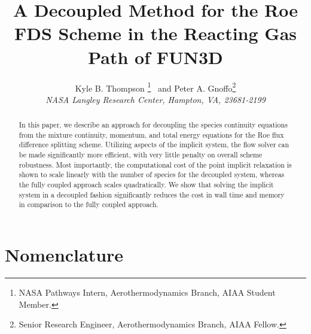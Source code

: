 \documentclass[]{aiaa-tc}%
\title{A Decoupled Method for the Roe FDS Scheme in the Reacting Gas Path of FUN3D}
\author{
  Kyle B. Thompson%
    \thanks{NASA Pathways Intern, Aerothermodynamics Branch, AIAA Student Member.}
  \ and Peter A. Gnoffo\thanks{Senior Research Engineer, Aerothermodynamics Branch, AIAA Fellow.}\\
  {\normalsize\itshape
   NASA Langley Research Center, Hampton, VA, 23681-2199}\\
 }
\begin{document}
\maketitle

\begin{abstract}
In this paper, we describe an approach for decoupling the species continuity equations from the mixture continuity, momentum, and total energy equations for the Roe flux difference splitting scheme.  Utilizing aspects of the implicit system, the flow solver can be made significantly more efficient, with very little penalty on overall scheme robustness.  Most importantly, the computational cost of the point implicit relaxation is shown to scale linearly with the number of species for the decoupled system, whereas the fully coupled approach scales quadratically.  We show that solving the implicit system in a decoupled fashion significantly reduces the cost in wall time and memory in comparison to the fully coupled approach.
\end{abstract}

\section*{Nomenclature}
\end{document}
